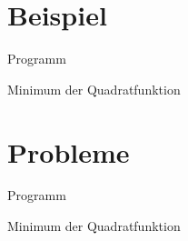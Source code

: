 \documentclass[\outputformat]{beamer}
\begin{document}


\section{Beispiel}
\begin{frame}{Programm}\tableofcontents[currentsection]\end{frame}

\begin{frame}{Minimum der Quadratfunktion}

\end{frame}

\section{Probleme}
\begin{frame}{Programm}\tableofcontents[currentsection]\end{frame}

\begin{frame}{Minimum der Quadratfunktion}

\end{frame}
\end{document}
